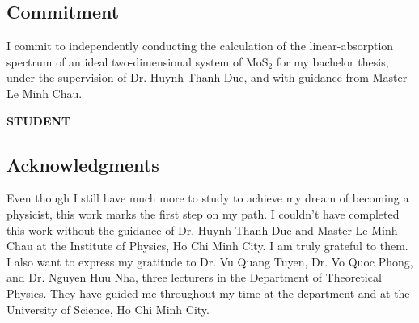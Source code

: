 \documentclass[12pt,english,a4paper]{article}
\begin{document}
%			
%			
%			
%			
%			
%			
	\newpage
	\begin{center}
		
		\section*{Commitment}
	\end{center}
	I commit to independently conducting the calculation of the linear-absorption spectrum of an ideal two-dimensional system of $\mathrm{MoS}_2$ for my bachelor thesis, under  the supervision of Dr. Huynh Thanh Duc, and with guidance from Master Le Minh Chau.\\[2cm]
\parbox{0.75in}{\centering \textbf{}} \hfill \parbox{2.5in}{\centering \textbf{STUDENT}}
	\newpage
	\begin{center}
		\section*{Acknowledgments}
	\end{center}
	\quad Even though I still have much more to study to achieve my dream of becoming a physicist, this work marks the first step on my path. I couldn't have completed this work without the guidance of Dr. Huynh Thanh Duc and Master Le Minh Chau at the Institute of Physics, Ho Chi Minh City. I am truly grateful to them.\\\null
	\quad I also want to express my gratitude to Dr. Vu Quang Tuyen, Dr. Vo Quoc Phong, and Dr. Nguyen Huu Nha, three lecturers in the Department of Theoretical Physics. They have guided me throughout my time at the department and at the University of Science, Ho Chi Minh City.\\\null
\end{document}
